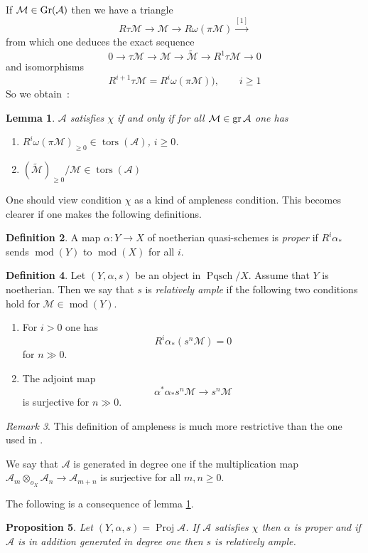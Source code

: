 \documentclass{amsproc}
\def\Ascr{{\mathcal A}}
\def\Mscr{{\mathcal M}}
\def\gr{\mathop{\text{gr}}}
\def\Gr{\mathop{\text{Gr}}}
\def\tors{\operatorname{tors}}
\def\gr{\operatorname {gr}}
\def\Pqsch{\operatorname {Pqsch}}
\def\coh{\operatorname {mod}}
\def\gr{\operatorname {gr}}
\def\tors{\operatorname {tors}}
\def\Proj{\operatorname {Proj}}
\def\r{\rightarrow}
\let\oldtext\text
\def\text#1{\oldtext{\upshape #1}}
\newtheorem{lemmas}{Lemma}[subsection]
\newtheorem{propositions}[lemmas]{Proposition}
\theoremstyle{definition}
\newtheorem{definitions}[lemmas]{Definition}
\theoremstyle{remark}
\newtheorem{remarks}[lemmas]{Remark}
\numberwithin{equation}{section}
\numberwithin{table}{section}
\numberwithin{figure}{section}
\def\gr{\mathop{\text{gr}}}
\def\Gr{\mathop{\text{Gr}}}
\begin{document}
If $\Mscr\in \Gr(\Ascr)$ then we have a triangle 
\[
R\tau\Mscr\r \Mscr\r R\omega(\pi\Mscr)\xrightarrow{[1]}
\]
from which one deduces the
exact sequence
\begin{equation}
\label{ref:3.29a}
0\r \tau\Mscr\r\Mscr\r \tilde{\Mscr}\r R^1\tau \Mscr\r 0
\end{equation}
and isomorphisms
\begin{equation}
\label{ref:3.30a}
R^{i+1}\tau\Mscr=R^{i}\omega(\pi\Mscr)),\qquad i\ge 1
\end{equation}
So we obtain~:
\begin{lemmas}
\label{ref:3.9.3a}
$\Ascr$ satisfies $\chi$ if and only if for all $\Mscr\in\gr \Ascr$
one has
\begin{enumerate}
\item $R^i\omega (\pi\Mscr)_{\ge 0}\in \tors(\Ascr)$, $i\ge 0$.
\item $(\tilde{\Mscr})_{\ge 0}/\Mscr\in \tors(\Ascr)$
\end{enumerate}
\end{lemmas}
One should view  condition $\chi$  as a  kind of ampleness condition. 
This becomes clearer if one makes the following definitions.
\begin{definitions} 
\label{ref:3.9.4a}
A map $\alpha:Y\r X$ of noetherian
quasi-schemes is \emph{proper} if $R^i\alpha_\ast$ sends $\coh(Y)$ to
$\coh(X)$ for all $i$.
\end{definitions}
\begin{definitions} Let $(Y,\alpha,s)$ be an object in $\Pqsch/X$.
Assume that $Y$ is noetherian.
Then we say that $s$ is \emph{relatively ample} if the following two
conditions hold for $\Mscr\in\coh(Y)$.
\begin{enumerate}
\item For $i>0$ one has
\[
R^i\alpha_\ast(s^n\Mscr)=0
\]
for $n\gg 0$.
\item The adjoint map 
\[
\alpha^\ast \alpha_\ast s^n\Mscr\r s^n\Mscr
\]
is surjective for $n\gg 0$.
\end{enumerate}
\begin{remarks}
This definition of ampleness is much more restrictive than the one
used in \cite{AZ}.
\end{remarks}
\end{definitions}
 We say that $\Ascr$ is generated in
degree one if the multiplication map $\Ascr_m\otimes_{o_X}\Ascr_n\r
\Ascr_{m+n}$ is surjective for all $m,n\ge 0$.

The following is a consequence of lemma \ref{ref:3.9.3a}.
\begin{propositions}
\label{ref:3.9.7a} Let $(Y,\alpha,s)=\Proj \Ascr$. If $\Ascr$ satisfies
$\chi$ then $\alpha$ is proper and if $\Ascr$ is in addition generated
in degree one  then $s$ is relatively ample.
\end{propositions}
\end{document}

